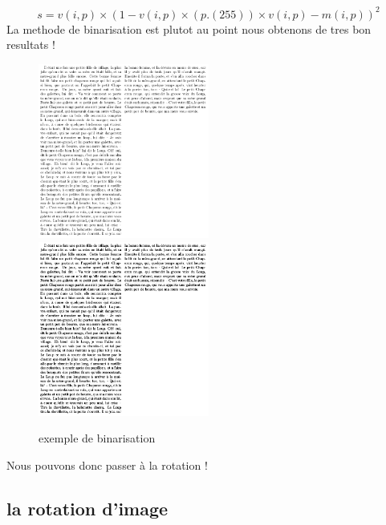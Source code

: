 \documentclass[12pt]{article}
\begin{document}
\[ s = v(i,p) \times (1 - v(i,p) \times (p.(255)) \times v(i,p) - m(i,p))^{2}\]
La methode de binarisation est plutot au point nous obtenons de tres bon resultats !
\begin{figure}[h]
  \includegraphics[width=0.50\textwidth]{img/bin.png}
  \includegraphics[width=0.50\textwidth]{img/bin2.png}
  \caption{exemple de binarisation}
\end{figure}
Nous pouvons donc passer à la rotation !
\newpage
\subsection{la rotation d'image}
\end{document}
